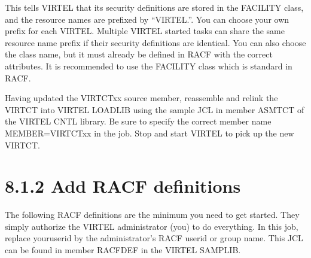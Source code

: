 \documentclass[letterpaper,10pt,english]{sphinxmanual}
\begin{document}
This tells VIRTEL that its security definitions are stored in the FACILITY class, and the resource names are prefixed by “VIRTEL.”. You can choose your own prefix for each VIRTEL. Multiple VIRTEL started tasks can share the same resource name prefix if their security definitions are identical. You can also choose the class name, but it must already be defined in RACF with the correct attributes. It is recommended to use the FACILITY class which is standard in RACF.

Having updated the VIRTCTxx source member, reassemble and relink the VIRTCT into VIRTEL LOADLIB using the sample JCL in member ASMTCT of the VIRTEL CNTL library. Be sure to specify the correct member name MEMBER=VIRTCTxx in the job. Stop and start VIRTEL to pick up the new VIRTCT.


\section{8.1.2 Add RACF definitions}
\label{\detokenize{Installation_Guide:add-racf-definitions}}
The following RACF definitions are the minimum you need to get started. They simply authorize the VIRTEL administrator (you) to do everything. In this job, replace youruserid by the administrator’s RACF userid or group name. This JCL can be found in member RACFDEF in the VIRTEL SAMPLIB.
\end{document}
